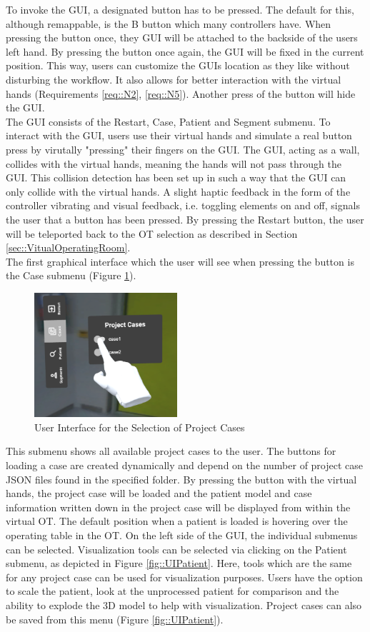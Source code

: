 To invoke the GUI, a designated button has to be pressed.
The default for this, although remappable, is the B button which many controllers have.
When pressing the button once, they GUI will be attached to the backside of the users left hand.
By pressing the button once again, the GUI will be fixed in the current position.
This way, users can customize the GUIs location as they like without disturbing the workflow.
It also allows for better interaction with the virtual hands (Requirements \ref{req::N2}, \ref{req::N5}).
Another press of the button will hide the GUI.
\\ The GUI consists of the Restart, Case, Patient and Segment submenu.
To interact with the GUI, users use their virtual hands and simulate a real button press by virutally "pressing" their fingers on the GUI.
The GUI, acting as a wall, collides with the virtual hands, meaning the hands will not pass through the GUI.
This collision detection has been set up in such a way that the GUI can only collide with the virtual hands.
A slight haptic feedback in the form of the controller vibrating and visual feedback, i.e. toggling elements on and off, signals the user that a button has been pressed.
By pressing the Restart button, the user will be teleported back to the OT selection as described in Section \ref{sec::VitualOperatingRoom}.
\\ The first graphical interface which the user will see when pressing the button is the Case submenu (Figure \ref{fig::UIProjectCase}).
\begin{figure}[ht]
    \centering
    \includegraphics[width=200px]{images/implementation/user_interface/project_cases.png}
    \caption{\label{fig::UIProjectCase}User Interface for the Selection of Project Cases}
\end{figure}

This submenu shows all available project cases to the user.
The buttons for loading a case are created dynamically and depend on the number of project case JSON files found in the specified folder.
By pressing the button with the virtual hands, the project case will be loaded and the patient model and case information 
written down in the project case will be displayed from within the virtual OT.
The default position when a patient is loaded is hovering over the operating table in the OT.
On the left side of the GUI, the individual submenus can be selected.
Visualization tools can be selected via clicking on the Patient submenu, as depicted in Figure \ref{fig::UIPatient}.
Here, tools which are the same for any project case can be used for visualization purposes.
Users have the option to scale the patient, look at the unprocessed patient for comparison and the ability to explode the 3D model to help with visualization.
Project cases can also be saved from this menu (Figure \ref{fig::UIPatient}).

